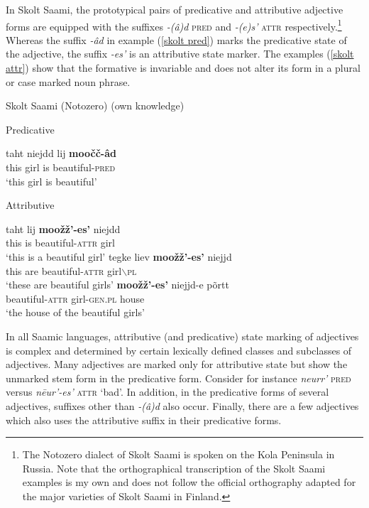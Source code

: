 In Skolt Saami, the prototypical pairs of predicative and attributive adjective forms are equipped with the suffixes \textit{-(â)d} \textsc{pred} and \textit{-(e)s'} \textsc{attr} respectively.\footnote{The Notozero dialect of Skolt Saami is spoken on the Kola Peninsula in Russia. Note that the orthographical transcription of the Skolt Saami examples is my own and does not follow the official orthography adapted for the major varieties of Skolt Saami in Finland.} Whereas the suffix \textit{-âd} in example (\ref{skolt pred}) marks the predicative state of the adjective, the suffix \textit{-es'} is an attributive state marker. The examples (\ref{skolt attr}) show that the formative is invariable and does not alter its form in a plural or case marked noun phrase.
\begin{exe}
\ex \rm{Skolt Saami (Notozero) (own knowledge)}
\begin{xlist}
\label{skolt pred}
\ex \rm{Predicative}
\begin{xlist}
\gll	taht niejdd lij \textbf{moočč-âd}\\
	this girl is beautiful-\textsc{pred}\\
\glt	‘this girl is beautiful’
\end{xlist}
\label{skolt attr}
\ex \rm{Attributive} 
\begin{xlist}
\ex
\gll 	taht lij \textbf{moožž'-es'} niejdd\\
	this is beautiful-\textsc{attr} girl\\
\glt	‘this is a beautiful girl’
\ex	
\gll	tegke liev \textbf{moožž'-es'} niejjd\\
	this are beautiful-\textsc{attr} girl$\backslash$\textsc{pl}\\
\glt	‘these are beautiful girls’
\ex	
\gll	\textbf{moožž'-es'} niejjd-e põrtt\\
	beautiful-\textsc{attr} girl-\textsc{gen.pl} house\\
\glt	‘the house of the beautiful girls’
\end{xlist}
\end{xlist}
\end{exe}
In all Saamic languages, attributive (and predicative) state marking of adjectives is complex and determined by certain lexically defined classes and subclasses of adjectives. Many adjectives are marked only for attributive state but show the unmarked stem form in the predicative form. Consider for instance \textit{neurr'} \textsc{pred} versus \textit{nēur'-es'} \textsc{attr} ‘bad’. In addition, in the predicative forms of several adjectives, suffixes other than \textit{-(â)d} also occur. Finally, there are a few adjectives which also uses the attributive suffix in their predicative forms.

